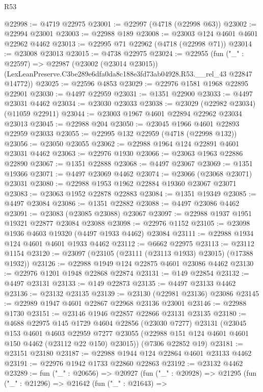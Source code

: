 \begin{lexlean}{R53}
\begin{coremodule}
@22998 := @4719 @22975
@23001 := @22997 (@4718 (@22998 @63))
@23002 := @22994 @23001
@23003 := @22988 @189
@23008 := @23003 @124 @4601 @4601 @22962 @4462
@23013 := @22995 @71 @22962 (@4718 (@22998 @71))
@23014 := @23008 @23013
@23015 := @4738 @22975
@23024 := @22955
    (fun ("_" : @22597) =>
    @22987
      (@23002 (@23014 @23015))
      (LexLeanPreserve.C3be289e6dfa0da8c188e3fd73ab04928.R53.__rel_43 @22847 @14772))
@23025 := @22596 @4853
@23029 := @22976 @1581 @1968 @22895 @22901
@23030 := @4497 @22959
@23031 := @1351 @22900
@23033 := @4497 @23031 @4462
@23034 := @23030 @23033
@23038 := @23029 (@22982 @23034) (@11059 @22911)
@23044 := @23003 @1967 @4601 @22894 @22962 @23034 @23013
@23045 := @22988 @204
@23050 := @23045 @1966 @4601 @22893 @22959 @23033
@23055 := @22995 @132 @22959 (@4718 (@22998 @132))
@23056 := @23050 @23055
@23062 := @22988 @1964 @124 @22891 @4601 @23031 @4462
@23063 := @22976 @1930
@23066 := @23063 @1963 @22886 @22890
@23067 := @1351 @22888
@23068 := @4497 @23067
@23069 := @1351 @19366
@23071 := @4497 @23069 @4462
@23074 := @23066 (@23068 @23071) @23031
@23080 := @22988 @1953 @1962 @22884 @19360 @23067 @23071
@23083 := @23063 @1952 @22878 @22883
@23084 := @1351 @19349
@23085 := @4497 @23084
@23086 := @1351 @22882
@23088 := @4497 @23086 @4462
@23091 := @23083 (@23085 @23088) @23067
@23097 := @22988 @1937 @1951 @19321 @22877 @23084 @23088
@23098 := @22976 @1152
@23105 := @23098 @1936 @4603 @19320 (@4497 @1933 @4462) @23084
@23111 := @22988 @1934 @124 @4601 @4601 @1933 @4462
@23112 := @6662 @22975
@23113 := @23112 @1154
@23120 := @23097 (@23105 (@23111 (@23113 @1933) @23015) (@17388 @1932))
@23126 := @22988 @1949 @124 @22875 @4601 @23086 @4462
@23130 := @22976 @1201 @1948 @22868 @22874
@23131 := @149 @22854
@23132 := @4497 @23131
@23133 := @149 @22873
@23135 := @4497 @23133 @4462
@23136 := @23132 @23135
@23139 := @23130 (@22981 @23136) @23086
@23145 := @22989 @1947 @4601 @22867 @22968 @23136 @23001
@23146 := @22988 @1730
@23151 := @23146 @1946 @22857 @22866 @23131 @23135
@23180 := @4688
    @22975
    @145
    @1729
    @4604
    @22856
    (@23030 @7277)
    @23131
    (@23045
      @153
      @4601
      @4603
      @22959
      @7277
      @23055
      (@22988 @151 @124 @4601 @4601 @150 @4462 (@23112 @22 @150) @23015))
    (@7306 @22852 @19)
@23181 := @23151 @23180
@23187 := @22988 @1944 @124 @22864 @4601 @23133 @4462
@23191 := @22976 @1942 @1733 @22860 @22863
@23192 := @23132 @4462
@23289 := fun ("_" : @20656) =>
  @20927
    (fun ("_" : @20928) =>
    @21295
      (fun ("_" : @21296) =>
      @21642
        (fun ("_" : @21643) =>

\end{coremodule}
\end{lexlean}
